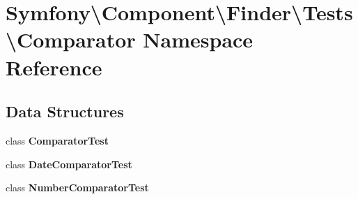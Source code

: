 \section{Symfony\textbackslash{}Component\textbackslash{}Finder\textbackslash{}Tests\textbackslash{}Comparator Namespace Reference}
\label{namespace_symfony_1_1_component_1_1_finder_1_1_tests_1_1_comparator}
\subsection*{Data Structures}
\begin{DoxyCompactItemize}
\item 
class {\bf Comparator\+Test}
\item 
class {\bf Date\+Comparator\+Test}
\item 
class {\bf Number\+Comparator\+Test}
\end{DoxyCompactItemize}
